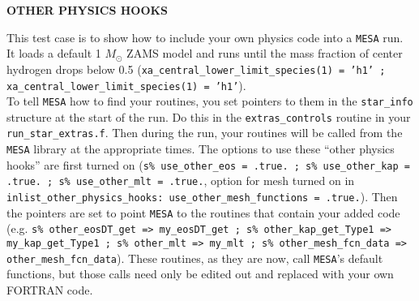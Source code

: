 \documentclass{article}
\begin{document}
	
	\begin{center}
		\begin{Large}
		       \textbf{OTHER PHYSICS HOOKS}\\
		\end{Large}
	\end{center}

        This test case is to show how to include your own physics code into a \texttt{MESA} run.  It loads a default 1 $M_\odot$ ZAMS model and runs until the mass fraction of center hydrogen drops below 0.5 (\texttt{xa\_central\_lower\_limit\_species(1) = 'h1' ; xa\_central\_lower\_limit\_species(1) = 'h1'}).\\

        To tell \texttt{MESA} how to find your routines, you set pointers to them in the \texttt{star\_info} structure at the start of the run.  Do this in the \texttt{extras\_controls} routine in your \texttt{run\_star\_extras.f}.  Then during the run, your routines will be called from the \texttt{MESA} library at the appropriate times.  The options to use these ``other physics hooks'' are first turned on (\texttt{s\% use\_other\_eos = .true. ; s\% use\_other\_kap = .true. ; s\% use\_other\_mlt = .true.}, option for mesh turned on in \texttt{inlist\_other\_physics\_hooks: use\_other\_mesh\_functions = .true.}).  Then the pointers are set to point \texttt{MESA} to the routines that contain your added code (e.g. \texttt{s\% other\_eosDT\_get => my\_eosDT\_get ; s\% other\_kap\_get\_Type1 => my\_kap\_get\_Type1 ; s\% other\_mlt => my\_mlt ; s\% other\_mesh\_fcn\_data => other\_me\-sh\_fcn\_data}).  These routines, as they are now, call \texttt{MESA}'s default functions, but those calls need only be edited out and replaced with your own FORTRAN code.\\
\end{document}
